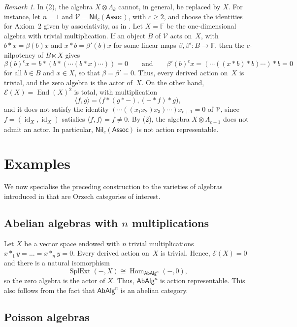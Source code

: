 \documentclass[reqno,a4paper]{amsart}
\theoremstyle{plain}
\theoremstyle{definition}
\theoremstyle{remark}
\newtheorem{remark}[subsection]{Remark}
\numberwithin{equation}{section}
\newcommand{\F}{\mathbb{F}}
\newcommand{\E}{\mathcal{E}}
\newcommand{\V}{\mathcal{V}}
\DeclareMathOperator{\Hom}{Hom}
\DeclareMathOperator{\SplExt}{SplExt}
\DeclareMathOperator{\End}{End}
\DeclareMathOperator{\id}{id}
\newcommand{\Assoc}{\ensuremath{\mathsf{Assoc}}}
\newcommand{\AbAlg}{\ensuremath{\mathsf{AbAlg}}}
\newcommand{\Nil}{\ensuremath{\mathsf{Nil}}}
\begin{document}
\begin{remark}\label{RemarkTensorNecessary}
In (2), the algebra $X\otimes\Lambda_k$ cannot, in general, be replaced by $X$. For instance, let $n=1$ and $\V=\Nil_c(\Assoc)$, with $c\geq2$, and choose the identities for Axiom~2 given by associativity, as in . Let $X=\F$ be the one-dimensional algebra with trivial multiplication. If an object $B$ of $\V$ acts on~$X$, with $b\ast x=\beta(b)x$ and $x\ast b=\beta'(b)x$ for some linear maps $\beta,\beta'\colon B\to\F$, then the $c$-nilpotency of $B\ltimes X$ gives
\[
\beta(b)^cx=b\ast(b\ast(\cdots(b\ast x)\cdots))=0
\qquad\text{and}\qquad
\beta'(b)^cx=(\cdots((x\ast b)\ast b)\cdots)\ast b=0
\]
for all $b\in B$ and $x\in X$, so that $\beta=\beta'=0$. Thus, every derived action on~$X$ is trivial, and the zero algebra is the actor of~$X$. On the other hand, $\E(X)=\End(X)^2$ is total, with multiplication
\[
\langle f,g\rangle=\bigl(f\ast(g\ast-),(-\ast f)\ast g\bigr),
\]
and it does not satisfy the identity $(\cdots((x_1x_2)x_3)\cdots)x_{c+1}=0$ of $\V$, since $f=(\id_X,\id_X)$ satisfies $\langle f,f\rangle=f\neq0$. By (2), the algebra $X\otimes\Lambda_{c+1}$ does not admit an actor. In particular, $\Nil_c(\Assoc)$ is not action representable.
\end{remark}

\section{Examples}\label{SecEx}

We now specialise the preceding construction to the varieties of algebras introduced in  that are Orzech categories of interest.

\subsection{Abelian algebras with $n$ multiplications}\label{SecAb}

Let $X$ be a vector space endowed with $n$ trivial multiplications $x\ast_1 y=\ldots=x\ast_n y=0$.
Every derived action on~$X$ is trivial. Hence, $\E(X)=0$ and there is a natural isomorphism
\[
\SplExt(-,X)\cong\Hom_{\AbAlg^n}(-,0),
\]
so the zero algebra is the actor of $X$. Thus, $\AbAlg^n$ is action representable. This also follows from the fact that $\AbAlg^n$ is an abelian category.

\subsection{Poisson algebras}\label{SecPoisson}
\end{document}
